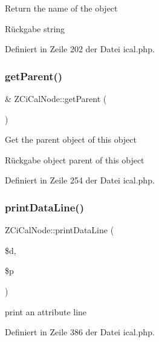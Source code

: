 Return the name of the object

\begin{DoxyReturn}{Rückgabe}
string 
\end{DoxyReturn}


Definiert in Zeile 202 der Datei ical.\+php.

\mbox{\label{class_z_ci_cal_node_afb1305c51f153ab244078ea2e12ece52}} 
\subsubsection{\texorpdfstring{get\+Parent()}{getParent()}}
{\footnotesize\ttfamily \& Z\+Ci\+Cal\+Node\+::get\+Parent (\begin{DoxyParamCaption}{ }\end{DoxyParamCaption})}

Get the parent object of this object

\begin{DoxyReturn}{Rückgabe}
object parent of this object 
\end{DoxyReturn}


Definiert in Zeile 254 der Datei ical.\+php.

\mbox{\label{class_z_ci_cal_node_a5a6d9ff591aeeed0c279b52995aac89c}} 
\subsubsection{\texorpdfstring{print\+Data\+Line()}{printDataLine()}}
{\footnotesize\ttfamily Z\+Ci\+Cal\+Node\+::print\+Data\+Line (\begin{DoxyParamCaption}\item[{}]{\$d,  }\item[{}]{\$p }\end{DoxyParamCaption})}

print an attribute line 

Definiert in Zeile 386 der Datei ical.\+php.

\mbox{\label{class_z_ci_cal_node_a5d514a4d88635145e6a7e62e49e671ae}} 
